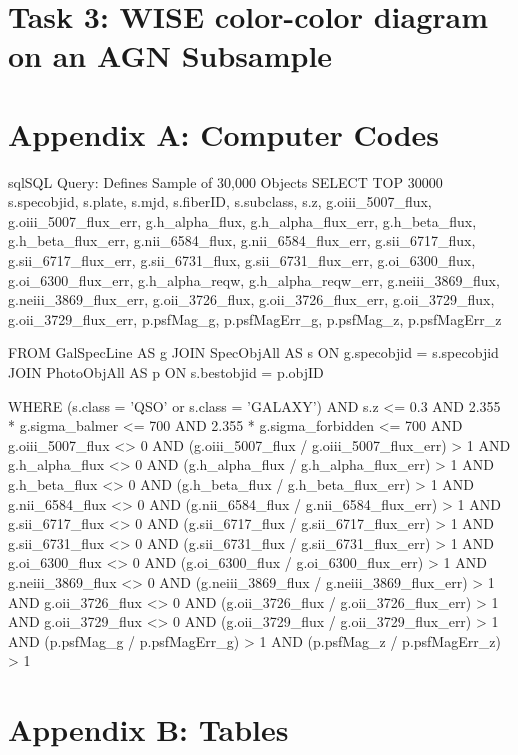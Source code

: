 \documentclass[letterpaper, oneside]{article}
\begin{document}
\section*{Task 3: WISE color-color diagram on an AGN Subsample}





\pagebreak

\appendix

\section*{Appendix A: Computer Codes}

\begin{sourcecode}[\label{sdss_query}]{sql}{SQL Query: Defines Sample of 30,000 Objects}
SELECT TOP 30000 s.specobjid, s.plate, s.mjd, s.fiberID, 
s.subclass, s.z, 
g.oiii_5007_flux, g.oiii_5007_flux_err, 
g.h_alpha_flux, g.h_alpha_flux_err, 
g.h_beta_flux, g.h_beta_flux_err, 
g.nii_6584_flux, g.nii_6584_flux_err, 
g.sii_6717_flux, g.sii_6717_flux_err, 
g.sii_6731_flux, g.sii_6731_flux_err, 
g.oi_6300_flux, g.oi_6300_flux_err, 
g.h_alpha_reqw, g.h_alpha_reqw_err, 
g.neiii_3869_flux, g.neiii_3869_flux_err, 
g.oii_3726_flux, g.oii_3726_flux_err, 
g.oii_3729_flux, g.oii_3729_flux_err, 
p.psfMag_g, p.psfMagErr_g, 
p.psfMag_z, p.psfMagErr_z

FROM GalSpecLine AS g 
JOIN SpecObjAll AS s ON g.specobjid = s.specobjid
JOIN PhotoObjAll AS p ON s.bestobjid = p.objID

WHERE
(s.class = 'QSO' or s.class = 'GALAXY')
AND s.z <= 0.3
AND 2.355 * g.sigma_balmer <= 700
AND 2.355 * g.sigma_forbidden <= 700
AND g.oiii_5007_flux <> 0
AND (g.oiii_5007_flux / g.oiii_5007_flux_err) > 1
AND g.h_alpha_flux <> 0
AND (g.h_alpha_flux / g.h_alpha_flux_err) > 1
AND g.h_beta_flux <> 0
AND (g.h_beta_flux / g.h_beta_flux_err) > 1
AND g.nii_6584_flux <> 0
AND (g.nii_6584_flux / g.nii_6584_flux_err) > 1
AND g.sii_6717_flux <> 0
AND (g.sii_6717_flux / g.sii_6717_flux_err) > 1
AND g.sii_6731_flux <> 0
AND (g.sii_6731_flux / g.sii_6731_flux_err) > 1
AND g.oi_6300_flux <> 0
AND (g.oi_6300_flux / g.oi_6300_flux_err) > 1
AND g.neiii_3869_flux <> 0
AND (g.neiii_3869_flux / g.neiii_3869_flux_err) > 1
AND g.oii_3726_flux <> 0
AND (g.oii_3726_flux / g.oii_3726_flux_err) > 1
AND g.oii_3729_flux <> 0
AND (g.oii_3729_flux / g.oii_3729_flux_err) > 1
AND (p.psfMag_g / p.psfMagErr_g) > 1
AND (p.psfMag_z / p.psfMagErr_z) > 1
\end{sourcecode}

\section*{Appendix B: Tables}

% 



\end{document}
